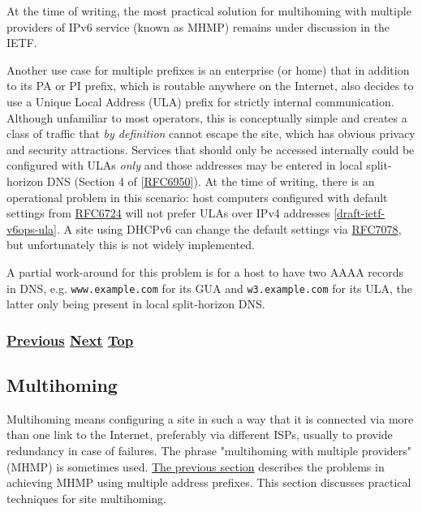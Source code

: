 \documentclass[
]{article}
\begin{document}
At the time of writing, the most practical solution for multihoming with
multiple providers of IPv6 service (known as MHMP) remains under
discussion in the IETF.

Another use case for multiple prefixes is an enterprise (or home) that
in addition to its PA or PI prefix, which is routable anywhere on the
Internet, also decides to use a Unique Local Address (ULA) prefix for
strictly internal communication. Although unfamiliar to most operators,
this is conceptually simple and creates a class of traffic that \emph{by
definition} cannot escape the site, which has obvious privacy and
security attractions. Services that should only be accessed internally
could be configured with ULAs \emph{only} and those addresses may be
entered in local split-horizon DNS (Section 4 of
{[}\href{https://www.rfc-editor.org/info/rfc6950}{RFC6950}{]}). At the
time of writing, there is an operational problem in this scenario: host
computers configured with default settings from
\href{https://www.rfc-editor.org/info/rfc6724}{RFC6724} will not prefer
ULAs over IPv4 addresses
{[}\href{https://datatracker.ietf.org/doc/draft-ietf-v6ops-ula/}{draft-ietf-v6ops-ula}{]}.
A site using DHCPv6 can change the default settings via
\href{https://www.rfc-editor.org/info/rfc7078}{RFC7078}, but
unfortunately this is not widely implemented.

A partial work-around for this problem is for a host to have two AAAA
records in DNS, e.g. \texttt{www.example.com} for its GUA and
\texttt{w3.example.com} for its ULA, the latter only being present in
local split-horizon DNS.

\subsubsection{\texorpdfstring{\hyperref[security-operation]{Previous}
\hyperref[multihoming]{Next}
\hyperref[management-and-operations]{Top}}{Previous Next Top}}\label{previous-next-top-25}

\pagebreak

\subsection{Multihoming}\label{multihoming}

Multihoming means configuring a site in such a way that it is connected
via more than one link to the Internet, preferably via different ISPs,
usually to provide redundancy in case of failures. The phrase
"multihoming with multiple providers" (MHMP) is sometimes used.
\hyperref[multi-prefix-operation]{The previous section} describes the
problems in achieving MHMP using multiple address prefixes. This section
discusses practical techniques for site multihoming.
\end{document}
